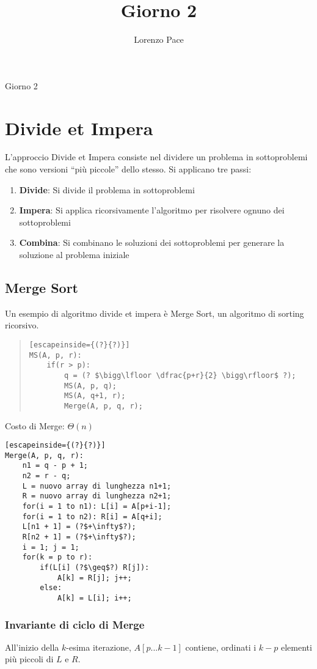\documentclass[a4paper,10pt]{article}
\title{Giorno 2}
\author{Lorenzo Pace}
\theoremstyle{definition}
\begin{document}
\begin{center}
    \LARGE Giorno 2
\end{center}
\section{Divide et Impera}
L'approccio Divide et Impera consiste nel dividere un problema in sottoproblemi che sono versioni ``più piccole'' dello stesso. Si applicano tre passi:
\begin{enumerate}
    \item \textbf{Divide}: Si divide il problema in sottoproblemi
    \item \textbf{Impera}: Si applica ricorsivamente l'algoritmo per risolvere ognuno dei sottoproblemi
    \item \textbf{Combina}: Si combinano le soluzioni dei sottoproblemi per generare la soluzione al problema iniziale
\end{enumerate}
\subsection{Merge Sort}
Un esempio di algoritmo divide et impera è Merge Sort, un algoritmo di sorting ricorsivo.
\begin{multicols}{2}
\begin{quote}
 
\begin{lstlisting}[escapeinside={(?}{?)}]
MS(A, p, r):
    if(r > p):
        q = (? $\bigg\lfloor \dfrac{p+r}{2} \bigg\rfloor$ ?);
        MS(A, p, q);
        MS(A, q+1, r);
        Merge(A, p, q, r);
\end{lstlisting}

\end{quote}

\bigskip
\bigskip
\bigskip
\bigskip
\bigskip
Costo di Merge: $\Theta(n)$

 \begin{lstlisting}[escapeinside={(?}{?)}]
Merge(A, p, q, r):
    n1 = q - p + 1;
    n2 = r - q;
    L = nuovo array di lunghezza n1+1;
    R = nuovo array di lunghezza n2+1;
    for(i = 1 to n1): L[i] = A[p+i-1];
    for(i = 1 to n2): R[i] = A[q+i];
    L[n1 + 1] = (?$+\infty$?);
    R[n2 + 1] = (?$+\infty$?);
    i = 1; j = 1;
    for(k = p to r):
        if(L[i] (?$\geq$?) R[j]):
            A[k] = R[j]; j++;
        else:
            A[k] = L[i]; i++;
\end{lstlisting}
\end{multicols}
\subsubsection{Invariante di ciclo di Merge}
All'inizio della $k$-esima iterazione, $A[p...k-1]$ contiene, ordinati i $k-p$ elementi più piccoli di $L$ e $R$.
\end{document}
